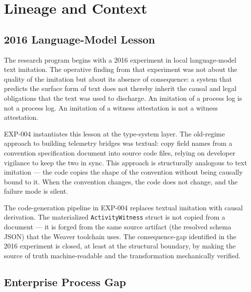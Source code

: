 
\section{Lineage and Context}
\label{sec:otel-weaver-exp-004-registry-to-witness-lineage}

\subsection{2016 Language-Model Lesson}
\label{sec:otel-weaver-exp-004-registry-to-witness-lm-lesson}

The research program begins with a 2016 experiment in local language-model text imitation.
The operative finding from that experiment was not about the quality of the imitation but
about its absence of consequence: a system that predicts the surface form of text does not
thereby inherit the causal and legal obligations that the text was used to discharge. An
imitation of a process log is not a process log. An imitation of a witness attestation is
not a witness attestation.

EXP-004 instantiates this lesson at the type-system layer. The old-regime approach to
building telemetry bridges was textual: copy field names from a convention specification
document into source code files, relying on developer vigilance to keep the two in sync.
This approach is structurally analogous to text imitation --- the code copies the shape of
the convention without being causally bound to it. When the convention changes, the code
does not change, and the failure mode is silent.

The code-generation pipeline in EXP-004 replaces textual imitation with causal derivation.
The materialized \texttt{ActivityWitness} struct is not copied from a document --- it is
forged from the same source artifact (the resolved schema JSON) that the Weaver toolchain
uses. The consequence-gap identified in the 2016 experiment is closed, at least at the
structural boundary, by making the source of truth machine-readable and the transformation
mechanically verified.

\subsection{Enterprise Process Gap}
\label{sec:otel-weaver-exp-004-registry-to-witness-enterprise-gap}

